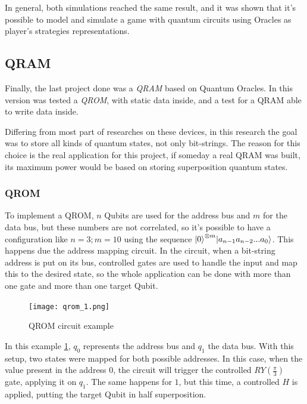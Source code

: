 \documentclass{article}
\begin{document}
In general, both simulations reached the same result, and it was shown that it's possible to model and simulate a game with quantum circuits using Oracles as player's strategies representations.

\subsection{QRAM} \label{qram}

Finally, the last project done was a \emph{QRAM} based on Quantum Oracles. In this version was tested a \emph{QROM}, with static data inside, and a test for a QRAM able to write data inside.

Differing from most part of researches on these devices, in this research the goal was to store all kinds of quantum states, not only bit-strings. The reason for this choice is the real application for this project, if someday a real QRAM was built, its maximum power would be based on storing superposition quantum states.

\subsubsection{QROM}

To implement a QROM, $n$ Qubits are used for the address bus and $m$ for the data bus, but these numbers are not correlated, so it's possible to have a configuration like $n=3; m=10$ using the sequence ${\ket{0}^{\otimes m}} {\ket{a_{n-1} a_{n-2} ... a_0}}$. This happens due the address mapping circuit. In the circuit, when a bit-string address is put on its bus, controlled gates are used to handle the input and map this to the desired state, so the whole application can be done with more than one gate and more than one target Qubit.

\newpage

\begin{figure}[h]
	\centering
	\texttt{[image: qrom\_1.png]}
	\caption{QROM circuit example}
	\label{fig:qrom}
\end{figure}


In this example \ref{fig:qrom}, $q_{0}$ represents the address bus and $q_{1}$  the data bus. With this setup, two states were mapped for both possible addresses. In this case, when the value present in the address $0$, the circuit will trigger the controlled $RY({\frac{\pi}{3}})$ gate, applying it on $q_{1}$. The same happens for $1$, but this time, a controlled $H$ is applied, putting the target Qubit in half superposition.
\end{document}

